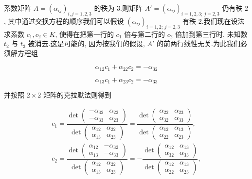 系数矩阵 $A = (\alpha_{ij})_{i, j = 1, 2, 3}$ 的秩为 $3$.则矩阵 $A' = (\alpha_{ij})_{i = 1, 2, 3;\ j = 2, 3}$ 仍有秩 $2$, 其中通过交换方程的顺序我们可以假设 $(\alpha_{ij})_{i = 1, 2;\ j = 2, 3}$ 有秩 $2$.我们现在设法求系数 $c_1, c_2 \in K$, 使得在把第一行的 $c_1$ 倍与第二行的 $c_2$ 倍加到第三行时, 未知数 $t_2$ 与 $t_3$ 被消去.这是可能的, 因为按我们的假设, $A'$ 的前两行线性无关.为此我们必须解方程组

\[
\alpha_{12} c_1 + \alpha_{22} c_2 = -\alpha_{32}
\]

\[
\alpha_{13} c_1 + \alpha_{23} c_2 = -\alpha_{33}
\]

并按照 $2 \times 2$ 矩阵的克拉默法则得到

\[
\begin{array}{l}
c_1 = \dfrac{\det\begin{pmatrix} -\alpha_{32} & \alpha_{22} \\ -\alpha_{33} & \alpha_{23} \end{pmatrix}}{\det\begin{pmatrix} \alpha_{12} & \alpha_{22} \\ \alpha_{13} & \alpha_{23} \end{pmatrix}} = \dfrac{\det\begin{pmatrix} \alpha_{22} & \alpha_{23} \\ \alpha_{32} & \alpha_{33} \end{pmatrix}}{\det\begin{pmatrix} \alpha_{12} & \alpha_{13} \\ \alpha_{22} & \alpha_{23} \end{pmatrix}}, \\
c_2 = \dfrac{\det\begin{pmatrix} \alpha_{12} & -\alpha_{32} \\ \alpha_{13} & -\alpha_{33} \end{pmatrix}}{\det\begin{pmatrix} \alpha_{12} & \alpha_{22} \\ \alpha_{13} & \alpha_{23} \end{pmatrix}} = -\dfrac{\det\begin{pmatrix} \alpha_{12} & \alpha_{13} \\ \alpha_{32} & \alpha_{33} \end{pmatrix}}{\det\begin{pmatrix} \alpha_{12} & \alpha_{13} \\ \alpha_{22} & \alpha_{23} \end{pmatrix}},
\end{array}
\]

